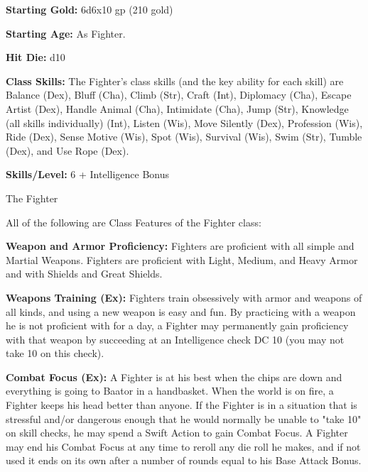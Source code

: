 \textbf{Starting Gold:} 6d6x10 gp (210 gold)

\textbf{Starting Age:} As Fighter.

\textbf{Hit Die:} d10

\textbf{Class Skills:} The Fighter's class skills (and the key ability for each skill) are Balance (Dex), Bluff (Cha), Climb (Str), Craft (Int), Diplomacy (Cha), Escape Artist (Dex), Handle Animal (Cha), Intimidate (Cha), Jump (Str), Knowledge (all skills individually) (Int), Listen (Wis), Move Silently (Dex), Profession (Wis), Ride (Dex), Sense Motive (Wis), Spot (Wis), Survival (Wis), Swim (Str), Tumble (Dex), and Use Rope (Dex).

\textbf{Skills/Level:} 6 + Intelligence Bonus

\modebab{}
\goodfort{}
\goodref{}
\goodwill{}

\begin{classtable}{The Fighter}
\end{classtable}

\ClassFeatures
All of the following are Class Features of the Fighter class:

\textbf{Weapon and Armor Proficiency:} Fighters are proficient with all simple and Martial Weapons. Fighters are proficient with Light, Medium, and Heavy Armor and with Shields and Great Shields.

\textbf{Weapons Training (Ex):} Fighters train obsessively with armor and weapons of all kinds, and using a new weapon is easy and fun. By practicing with a weapon he is not proficient with for a day, a Fighter may permanently gain proficiency with that weapon by succeeding at an Intelligence check DC 10 (you may not take 10 on this check).

\textbf{Combat Focus (Ex):} A Fighter is at his best when the chips are down and everything is going to Baator in a handbasket. When the world is on fire, a Fighter keeps his head better than anyone. If the Fighter is in a situation that is stressful and/or dangerous enough that he would normally be unable to "take 10" on skill checks, he may spend a Swift Action to gain Combat Focus. A Fighter may end his Combat Focus at any time to reroll any die roll he makes, and if not used it ends on its own after a number of rounds equal to his Base Attack Bonus.

